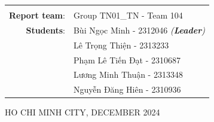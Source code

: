 \documentclass[a4paper]{article}
\begin{document}
\begin{titlepage}
\begin{table}[h]
\begin{tabular}{rl}
        & \\[10pt]
        \hspace{3 cm}\textbf{Report team}:
        & Group TN01\_TN - Team 104\\
        \textbf{Students}: 
        &  Bùi Ngọc Minh - 2312046 \emph{(\textbf{Leader})} \\
        &  Lê Trọng Thiện - 2313233\\
        &  Phạm Lê Tiến Đạt - 2310687\\
        &  Lương Minh Thuận - 2313348\\
        &  Nguyễn Đăng Hiên - 2310936\\
        \end{tabular}
    \end{table}
    
    \begin{center}
    {\footnotesize HO CHI MINH CITY, DECEMBER 2024}
    \end{center}
    \end{titlepage}
    
    \pagebreak
    \tableofcontents
    \pagebreak
    
    \printunsrtglossary[type={symbols}, title={List of Symbols}]
    \printunsrtglossary[type={abbreviations}, title={List of Acronyms}]
    \pagebreak
    \listoffigures
    \listoftables
    \pagebreak
    
    
\end{document}
